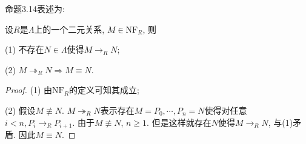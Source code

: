 命题3.14表述为:

设$R$是$\Lambda$上的一个二元关系, $M\in\mathrm{NF}_R$, 则

(1) 不存在$N\in\Lambda$使得$M\to_RN$;

(2) $M\twoheadrightarrow_R N\Rightarrow M\equiv N$.
\begin{proof}
    (1) 由$\mathrm{NF}_R$的定义可知其成立;
	
	(2) 假设$M\not\equiv N$. $M\twoheadrightarrow_R N$表示存在$M=P_0,\cdots,P_n=N$使得对任意$i<n,P_i\to_R P_{i+1}$. 由于$M\not\equiv N$, $n\geqslant 1$. 但是这样就存在$N$使得$M\to_R N$, 与(1)矛盾. 因此$M\equiv N$.
\end{proof}